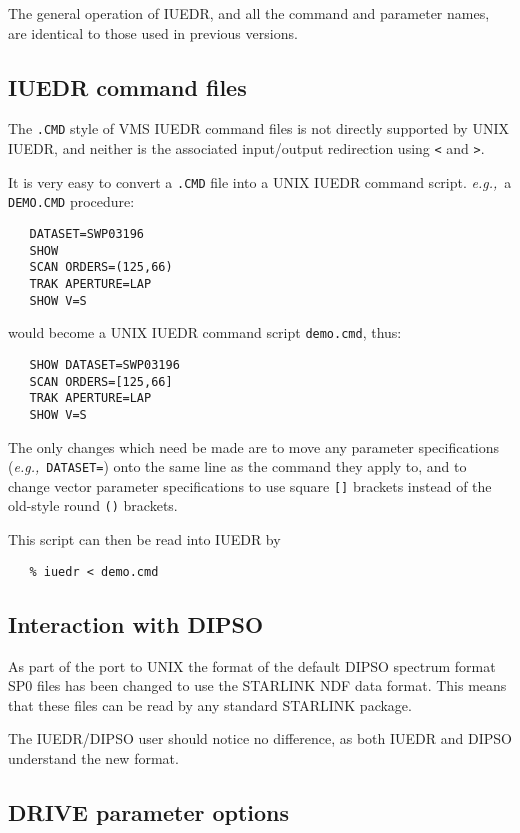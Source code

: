 The general operation of IUEDR, and all the command and parameter
names, are identical to those used in previous versions.

\subsection{IUEDR command files}

The \verb+.CMD+ style of VMS IUEDR command files is not directly supported by
UNIX IUEDR, and neither is the associated input/output redirection using
\verb+<+ and \verb+>+\@.

It is very easy to convert a {\tt .CMD} file into a UNIX IUEDR command
script.
{\it{e.g.,}}\ a {\tt DEMO.CMD} procedure:

\begin{verbatim}
   DATASET=SWP03196
   SHOW
   SCAN ORDERS=(125,66)
   TRAK APERTURE=LAP
   SHOW V=S
\end{verbatim}

would become a UNIX IUEDR command script \verb+demo.cmd+, thus:

\begin{verbatim}
   SHOW DATASET=SWP03196
   SCAN ORDERS=[125,66]
   TRAK APERTURE=LAP
   SHOW V=S
\end{verbatim}

The only changes which need be made are to move any parameter
specifications ({\it{e.g.,}}\ \verb+DATASET=+) onto the same line as the command
they apply to, and to change vector parameter specifications to use square
\verb+[]+ brackets instead of the old-style round \verb+()+ brackets.

This script can then be read into IUEDR by
\begin{verbatim}
   % iuedr < demo.cmd
\end{verbatim}

\subsection{Interaction with DIPSO}

As part of the port to UNIX the
format of the default DIPSO spectrum format SP0 files has been
changed to use the STARLINK NDF data format. This means that these
files can be read by any standard STARLINK package.

The IUEDR/DIPSO user should notice no difference, as both IUEDR and
DIPSO understand the new format.

\subsection{DRIVE parameter options}

